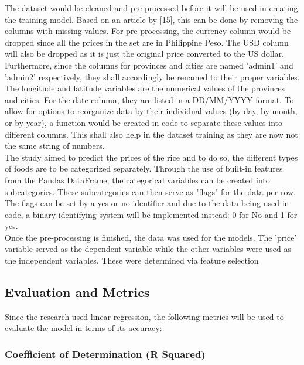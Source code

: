 \documentclass[runningheads]{llncs}
\begin{document}
The dataset would be cleaned and pre-processed before it will be used in creating the training model.  Based on an article by [15], this can be done by removing the columns with missing values. For pre-processing, the currency column would be dropped since all the prices in the set are in Philippine Peso. The USD column will also be dropped as it is just the original price converted to the US dollar. Furthermore, since the columns for provinces and cities are named 'admin1' and 'admin2' respectively, they shall accordingly be renamed to their proper variables. The longitude and latitude variables are the numerical values of the provinces and cities. For the date column, they are listed in a DD/MM/YYYY format. To allow for options to reorganize data by their individual values (by day, by month, or by year), a function would be created in code to separate these values into different columns. This shall also help in the dataset training as they are now not the same string of numbers.\\

The study aimed to predict the prices of the rice and to do so, the different types of foods are to be categorized separately. Through the use of built-in features from the Pandas DataFrame, the categorical variables can be created into subcategories. These subcategories can then serve as "flags" for the data per row. The flags can be set by a yes or no identifier and due to the data being used in code, a binary identifying system will be implemented instead: 0 for No and 1 for yes. \\

Once the pre-processing is finished, the data was used for the models. The 'price' variable served as the dependent variable while the other variables were used as the independent variables. These were determined via feature selection\\

\subsection{Evaluation and Metrics}

Since the research used linear regression, the following metrics will be used to evaluate the model in terms of its accuracy:

\subsubsection{Coefficient of Determination (R Squared)}
\end{document}
